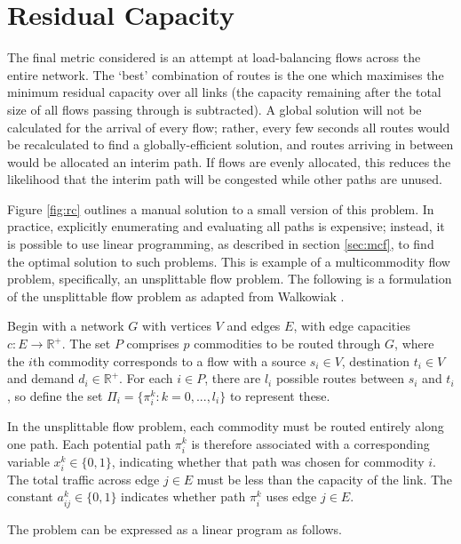 \section{Residual Capacity}
\label{sec:rc}
The final metric considered is an attempt at load-balancing flows across the entire network. The `best' combination of routes is the one which maximises the minimum residual capacity over all links (the capacity remaining after the total size of all flows passing through is subtracted). A global solution will not be calculated for the arrival of every flow; rather, every few seconds all routes would be recalculated to find a globally-efficient solution, and routes arriving in between would be allocated an interim path. If flows are evenly allocated, this reduces the likelihood that the interim path will be congested while other paths are unused.

Figure \ref{fig:rc} outlines a manual solution to a small version of this problem. In practice, explicitly enumerating and evaluating all paths is expensive; instead, it is possible to use linear programming, as described in section \ref{sec:mcf}, to find the optimal solution to such problems. This is example of a multicommodity flow problem, specifically, an unsplittable flow problem. The following is a formulation of the unsplittable flow problem as adapted from Walkowiak \cite{walkowiak:residual}. 

Begin with a network $G$ with vertices $V$ and edges $E$, with edge capacities $c : E \rightarrow \mathbb{R}^+$. The set $P$ comprises $p$ commodities to be routed through $G$, where the $i$th commodity corresponds to a flow with a source $s_i \in V$, destination $t_i \in V$ and demand $d_i \in \mathbb{R}^+$. For each $i \in P$, there are $l_i$ possible routes between $s_i$ and $t_i$, so define the set $\Pi_i = \{\pi_i^k : k = 0, ..., l_i\}$ to represent these.

In the unsplittable flow problem, each commodity must be routed entirely along one path. Each potential path $\pi_i^k$ is therefore associated with a corresponding variable $x_i^k \in \{0,1\}$, indicating whether that path was chosen for commodity $i$. The total traffic across edge $j \in E$ must be less than the capacity of the link. The constant $a_{ij}^k \in \{0,1\}$ indicates whether path $\pi_i^k$ uses edge $j \in E$.

The problem can be expressed as a linear program as follows.

